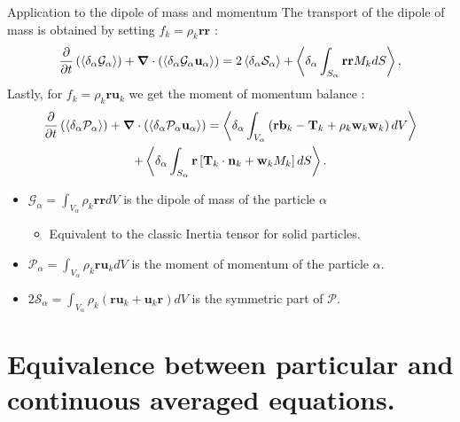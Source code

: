 \documentclass{sintefbeamer}
\newcommand{\nablab}{\bm{\nabla}}
\begin{document}
\begin{frame}
  {Application to the dipole of mass and momentum}
  The transport of the dipole of mass is obtained by setting $f_k = \rho_k \textbf{rr}$ :
  \begin{equation*}
    \pddt   \left(\pavg{\mathcal{G}_\alpha}\right)
    + \nablab \cdot \left(\pavg{\mathcal{G}_\alpha \textbf{u}_\alpha}\right) 
    = 2 \pavg{\mathcal{S}_\alpha}
    + \pavg{\int_{S_\alpha} \textbf{rr} M_k dS},
\end{equation*}
  Lastly, for $f_k = \rho_k \textbf{r} \textbf{u}_k$ we get the moment of momentum balance :
  \begin{multline}
    \pddt   \left(\pavg{\mathcal{P}_\alpha}\right)
    + \nablab \cdot \left(\pavg{\mathcal{P}_\alpha \textbf{u}_\alpha}\right) 
    = \pavg{\int_{V_\alpha} \left( 
        \textbf{r} \textbf{b}_k 
        - \textbf{T}_k
        + \rho_k \textbf{w}_k  \textbf{w}_k 
    \right) dV}\\
    + \pavg{
    \int_{S_\alpha} \textbf{r} \left[
        \textbf{T}_k \cdot \textbf{n}_k
        + \textbf{w}_k M_k
    \right] dS}.
\end{multline}
\begin{itemize}
  \item $\mathcal{G}_\alpha = \int_{V_\alpha} \rho_k\textbf{rr} dV$ is the dipole of mass of the particle $\alpha$ 
  \begin{itemize}
    \item Equivalent to the classic Inertia tensor for solid particles. 
  \end{itemize}
  \item $\mathcal{P}_\alpha = \int_{V_\alpha} \rho_k \textbf{r}\textbf{u}_k dV$ is the moment of momentum of the particle $\alpha$.
  \item $2\mathcal{S}_\alpha = \int_{V_\alpha} \rho_k (\textbf{r}\textbf{u}_k+\textbf{u}_k\textbf{r}) dV$ is the symmetric part of $\mathcal{P}$. 
\end{itemize}
\end{frame}

\section{Equivalence between particular and continuous averaged equations.}
\end{document}
